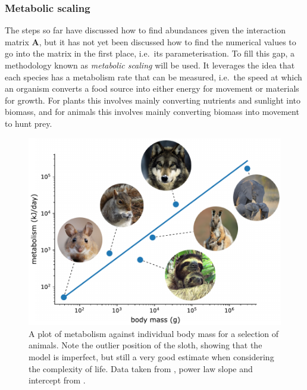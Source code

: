 


\subsubsection{Metabolic scaling}
The steps so far have discussed how to find abundances given the interaction matrix $\mathbf{A}$, but it has not yet been discussed how to find the numerical values to go into the matrix in the first place, i.e.\ its parameterisation.
To fill this gap, a methodology known as \emph{metabolic scaling} will be used. It leverages the idea that each species has a metabolism rate that can be measured, i.e.\ the speed at which an organism converts a food source into either energy for movement or materials for growth. For plants this involves mainly converting nutrients and sunlight into biomass, and for animals this involves mainly converting biomass into movement to hunt prey.

\begin{figure}
    \centering
    \includegraphics[width=.8\textwidth]{joy/metabolism.pdf}
    \caption[A plot of metabolism against individual body mass]{A plot of metabolism against individual body mass for a selection of animals. Note the outlier position of the sloth, showing that the model is imperfect, but still a very good estimate when considering the complexity of life. Data taken from \cite{Nagy1999}, power law slope and intercept from \cite[Fig.~2]{Brown2004}.}
    \label{fig:metabolism}
\end{figure}

